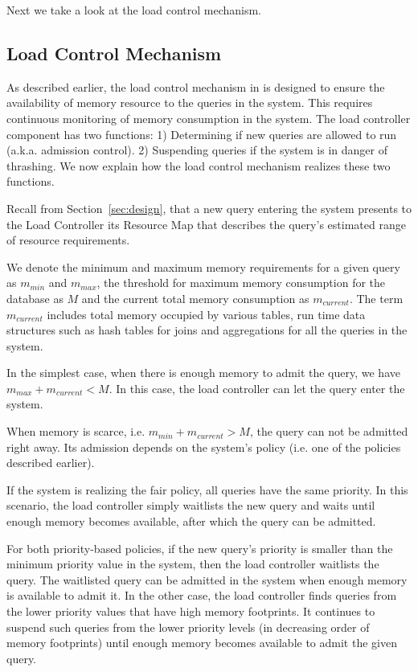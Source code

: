 Next we take a look at the load control mechanism. %
\subsection{Load Control Mechanism}\label{ssec:load-control-mech}
As described earlier, the load control mechanism in \sys{} is designed to ensure the availability of memory resource to the queries in the system.
This requires continuous monitoring of memory consumption in the system.
The load controller component has two functions:
1) Determining if new queries are allowed to run (a.k.a. admission control).
2) Suspending queries if the system is in danger of thrashing.
We now explain how the load control mechanism realizes these two functions.


Recall from Section~\ref{sec:design}, that a new query entering the system presents to the Load Controller its Resource Map that describes the query's estimated range of resource requirements.

We denote the minimum and maximum memory requirements for a given query as $m_{min}$ and $m_{max}$, the threshold for maximum memory consumption for the database as $M$ and the current total memory consumption as $m_{current}$. 
The term $m_{current}$ includes total memory occupied by various tables, run time data structures such as hash tables for joins and aggregations for all the queries in the system.

In the simplest case, when there is enough memory to admit the query, we have $m_{max} + m_{current} < M$. 
In this case, the load controller can let the query enter the system.

When memory is scarce, i.e. $m_{min}+m_{current}>M$, the query can not be admitted right away. 
Its admission depends on the system's policy (i.e. one of the policies described earlier).

If the system is realizing the fair policy, all queries have the same priority.
In this scenario, the load controller simply waitlists the new query and waits until enough memory becomes available, after which the query can be admitted.

For both priority-based policies, if the new query's priority is smaller than the minimum priority value in the system, then the load controller waitlists the query. 
The waitlisted query can be admitted in the system when enough memory is available to admit it.
In the other case, the load controller finds queries from the lower priority values that have high memory footprints. 
It continues to suspend such queries from the lower priority levels (in decreasing order of memory footprints) until enough memory becomes available to admit the given query. 

